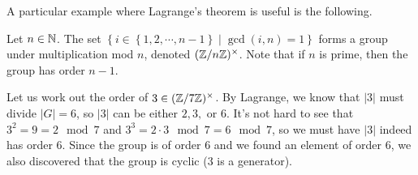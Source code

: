 \begin{example}
  A particular example where Lagrange's theorem is useful is the following. 
  
  Let $n\in\mathbb N$. The set $\left\{ i\in \left\{ 1,2,\cdots,n-1 \right\} \mid \gcd(i,n)=1 \right\}$ forms a group under multiplication mod $n$, denoted $(\mathbb Z/n\mathbb Z)^{\times}$. Note that if $n$ is prime, then the group has order $n-1$. 
  
  Let us work out the order of $3\in (\mathbb Z/7\mathbb Z)^{\times}$. By Lagrange, we know that $|3|$ must
  divide $|G|=6$, so $|3|$ can be either $2,3,$ or $6$. It's not hard to see that
  $3^2=9=2\mod 7$ and $3^3=2\cdot 3\mod 7=6\mod 7$, so we must have $|3|$ indeed has order $6$. Since the group
  is of order $6$ and we found an element of order $6$, we also discovered that the group is
  cyclic ($3$ is a generator).
\end{example}
